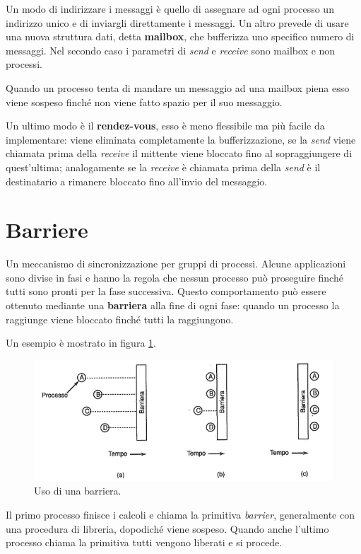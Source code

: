 Un modo di indirizzare i messaggi è quello di assegnare ad ogni processo un indirizzo unico e di inviargli direttamente i messaggi. Un altro prevede di usare una nuova struttura dati, detta \textbf{mailbox}, che bufferizza uno specifico numero di messaggi. Nel secondo caso i parametri di \textit{send} e \textit{receive} sono mailbox e non processi. 

Quando un processo tenta di mandare un messaggio ad una mailbox piena esso viene sospeso finché non viene fatto spazio per il suo messaggio.

Un ultimo modo è il \textbf{rendez-vous}, esso è meno flessibile ma più facile da implementare: viene eliminata completamente la bufferizzazione, se la \textit{send} viene chiamata prima della \textit{receive} il mittente viene bloccato fino al sopraggiungere di quest'ultima; analogamente se la \textit{receive} è chiamata prima della \textit{send} è il destinatario a rimanere bloccato fino all'invio del messaggio.







\section{Barriere}
Un meccanismo di sincronizzazione per gruppi di processi. Alcune applicazioni sono divise in fasi e hanno la regola che nessun processo può proseguire finché tutti sono pronti per la fase successiva. Questo comportamento può essere ottenuto mediante una \textbf{barriera} alla fine di ogni fase: quando un processo la raggiunge viene bloccato finché tutti la raggiungono.

Un esempio è mostrato in figura \ref{barriere}.

\begin{figure}[H]
    \centering
    \includegraphics[width=0.7\linewidth]{assets/barriere6.png}
    \caption{Uso di una barriera.}
    \label{barriere}
\end{figure}

Il primo processo finisce i calcoli e chiama la primitiva \textit{barrier}, generalmente con una procedura di libreria, dopodiché viene sospeso. Quando anche l'ultimo processo chiama la primitiva tutti vengono liberati e si procede.

